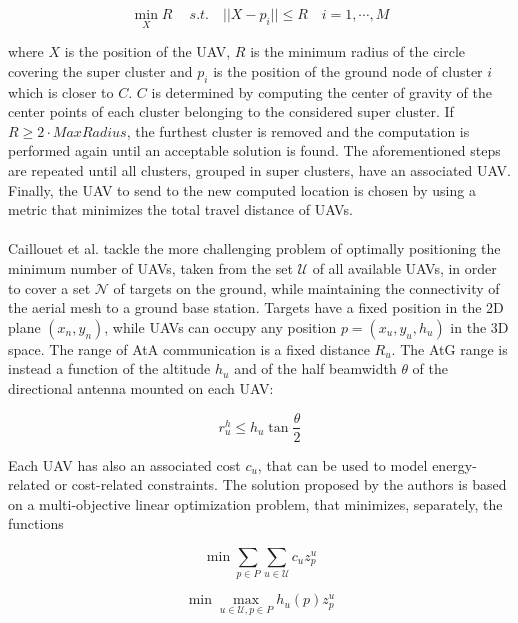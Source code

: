 \[\min_{X} R\ \quad s.t. \quad ||X-p_i|| \leq R \quad i=1,\cdots,M \]

where $X$ is the position of the \gls{UAV}, $R$ is the minimum radius of the circle covering the super cluster and $p_i$ is the position of the ground node of cluster $i$ which is closer to $C$. $C$ is determined by computing the center of gravity of the center points of each cluster belonging to the considered super cluster. If $R \geq 2 \cdot MaxRadius$, the furthest cluster is removed and the computation is performed again until an acceptable solution is found. The aforementioned steps are repeated until all clusters, grouped in super clusters, have an associated \gls{UAV}. Finally, the \gls{UAV} to send to the new computed location is chosen by using a metric that minimizes the total travel distance of \glspl{UAV}. \\ \\
Caillouet et al. \cite{ref:soa-plac-centr2} tackle the more challenging problem of optimally positioning the minimum number of \glspl{UAV}, taken from the set $\mathcal{U}$ of all available \glspl{UAV}, in order to cover a set $\mathcal{N}$ of targets on the ground, while maintaining the connectivity of the aerial mesh to a ground base station. Targets have a fixed position in the 2D plane $(x_n, y_n)$, while \glspl{UAV} can occupy any position $p = (x_u, y_u, h_u)$ in the 3D space. The range of \gls{AtA} communication is a fixed distance $R_u$. The \gls{AtG} range is instead a function of the altitude $h_u$ and of the half beamwidth $\theta$ of the directional antenna mounted on each \gls{UAV}:

\[r_u^h \leq h_u \tan{\frac{\theta}{2}}\]

Each \gls{UAV} has also an associated cost $c_u$, that can be used to model energy-related or cost-related constraints. The solution proposed by the authors is based on a multi-objective linear optimization problem, that minimizes, separately, the functions

\begin{equation} \label{eq:lin-prob1}
	\min \sum\limits_{p \in P} \sum\limits_{u \in \mathcal{U}} c_u z_p^u
\end{equation}

\begin{equation} \label{eq:lin-prob2}
	\min \max_{u \in \mathcal{U}, p \in P} h_u(p) z_p^u
\end{equation}

